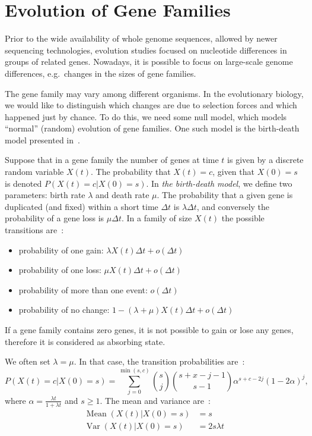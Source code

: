 \section{Evolution of Gene Families}

Prior to the wide availability of whole genome sequences, allowed by newer sequencing technologies, evolution studies focused on nucleotide differences in groups of related genes. Nowadays, it is possible to focus on large-scale genome differences, e.g.\ changes in the sizes of gene families.

The gene family may vary among different organisms. In the evolutionary biology, we would like to distinguish which changes are due to selection forces and which happened just by chance. To do this, we need some null model, which models ``normal'' (random) evolution of gene families. One such model is the birth-death  model presented in~\cite{hahn2005estimating}.

Suppose that in a gene family the number of genes at time $t$ is given by a discrete random variable $X(t)$. The probability that $X(t) = c$, given that $X(0) = s$ is denoted $P(X(t) = c | X(0) = s)$.
In \emph{the birth-death model}, we define two parameters: birth rate $\lambda$ and death rate $\mu$. The probability that a given gene is duplicated (and fixed) within a short time $\Delta t$ is $\lambda \Delta t$, and conversely the probability of a gene loss is $\mu \Delta t$. In a family of size $X(t)$ the possible transitions are~\cite{hahn2005estimating}:
\begin{itemize}
  \item probability of one gain: $\lambda X(t) \Delta t + o(\Delta t)$
  \item probability of one loss: $\mu X(t) \Delta t + o(\Delta t)$
  \item probability of more than one event: $o(\Delta t)$
  \item probability of no change: $1 - (\lambda + \mu) X(t) \Delta t + o(\Delta t)$
\end{itemize}
If a gene family contains zero genes, it is not possible to gain or lose any genes, therefore it is considered as absorbing state.

We often set $\lambda = \mu$. In that case, the transition probabilities are~\cite{hahn2005estimating}:
$$P(X(t) = c | X(0) = s) = \sum_{j=0}^{\min(s, c)} {s \choose j}{s+x-j-1 \choose s-1}\alpha^{s+c-2j}{(1-2\alpha)}^j,$$
where $\alpha = \frac{\lambda t}{1+ \lambda t}$ and $s \geq 1$. The mean and variance are~\cite{hahn2005estimating}:
\begin{align*}
  \operatorname{Mean}(X(t) | X(0) = s) &= s\\
  \operatorname{Var}(X(t) | X(0) = s) &= 2s\lambda t
\end{align*}

